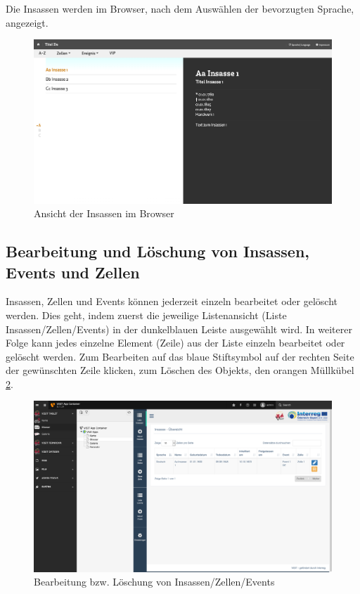 Die Insassen werden im Browser, nach dem Auswählen der bevorzugten Sprache, angezeigt.
\begin{figure}[ht!]
\centering
\includegraphics[width=12cm]{Figures/paula/glossar/insassenuebersicht_browser.png}
\caption{Ansicht der Insassen im Browser}
\label{img:insassenuebersicht_browser}
\end{figure}

\subsection{Bearbeitung und Löschung von Insassen, Events und Zellen}

Insassen, Zellen und Events können jederzeit einzeln bearbeitet oder gelöscht werden. Dies geht, indem zuerst die jeweilige Listenansicht (Liste Insassen/Zellen/Events) in der dunkelblauen Leiste ausgewählt wird. In weiterer Folge kann jedes einzelne Element (Zeile) aus der Liste einzeln bearbeitet oder gelöscht werden. Zum Bearbeiten auf das blaue Stiftsymbol auf der rechten Seite der gewünschten Zeile klicken, zum Löschen des Objekts, den orangen Müllkübel \ref{img:loeschung_insassen}.

\begin{figure}[ht!]
\centering
\includegraphics[width=12cm]{Figures/paula/glossar/loeschen_bearbeiten_insasse.png}
\caption{Bearbeitung bzw. Löschung von Insassen/Zellen/Events}
\label{img:loeschung_insassen}
\end{figure}


